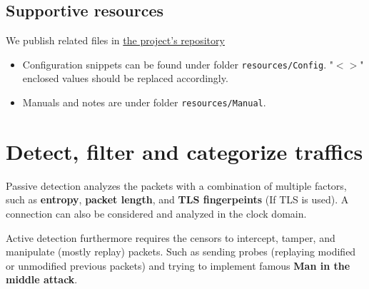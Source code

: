\subsection{Supportive resources}
\begin{frame}
    We publish related files in \href{https://gitlab.lrz.de/tuinh09/teaching/scni/repos/2024ws-hn/u157}{the project's repository}
    \begin{itemize}
        \item Configuration snippets can be found under folder \texttt{resources/Config}. "$<>$" enclosed values should be replaced accordingly.
        \item Manuals and notes are under folder \texttt{resources/Manual}.
    \end{itemize}
    
\end{frame}

\section{Detect, filter and categorize traffics}
\begin{frame}
    Passive detection analyzes the packets with a combination of multiple factors, such as \textbf{entropy}, \textbf{packet length}, and \textbf{TLS fingerpeints} (If TLS is used).
    A connection can also be considered and analyzed in the clock domain.

    Active detection furthermore requires the censors to intercept, tamper, and manipulate (mostly replay) packets. Such as sending probes (replaying modified or unmodified previous packets) and trying to implement famous \textbf{Man in the middle attack}.
\end{frame}


